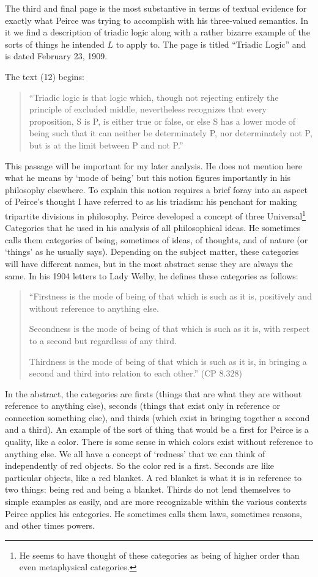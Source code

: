The third and final page is the most substantive in terms of textual evidence for exactly what Peirce was trying to accomplish with his three-valued semantics. In it we find a description of triadic logic along with a rather bizarre example of the sorts of things he intended $L$ to apply to. The page is titled ``Triadic Logic'' and is dated February 23, 1909. 

The text (12) begins: \begin{quotation}\noindent``Triadic logic is that logic which, though not rejecting entirely the principle of excluded middle, nevertheless recognizes that every proposition, S is P, is either true or false, or else S has a lower mode of being such that it can neither be determinately P, nor determinately not P, but is at the limit between P and not P.''\end{quotation} This passage will be important for my later analysis. He does not mention here what he means by `mode of being' but this notion figures importantly in his philosophy elsewhere. To explain this notion requires a brief foray into an aspect of Peirce's thought I have referred to as his triadism: his penchant for making tripartite divisions in philosophy.  Peirce developed a concept of three Universal\footnote{He seems to have thought of these categories as being of higher order than even metaphysical categories.} Categories that he used in his analysis of all philosophical ideas. He sometimes calls them categories of being, sometimes of ideas, of thoughts, and of nature (or `things' as he usually says). Depending on the subject matter, these categories will have different names, but in the most abstract sense they are always the same. In his 1904 letters to Lady Welby, he defines these categories as follows:
\begin{quotation}
\noindent``Firstness is the mode of being of that which is such as it is, positively and without reference to anything else.

Secondness is the mode of being of that which is such as it is, with respect to a second but regardless of any third.

Thirdness is the mode of being of that which is such as it is, in bringing a second and third into relation to each other.'' (CP 8.328)
\end{quotation}
 In the abstract, the categories are firsts (things that are what they are without reference to anything else), seconds (things that exist only in reference or connection something else), and thirds (which exist in bringing together a second and a third). An example of the sort of thing that would be a first for Peirce is a quality, like a color. There is some sense in which colors exist without reference to anything else. We all have a concept of `redness' that we can think of independently of red objects. So the color red is a first. Seconds are like particular objects, like a red blanket. A red blanket is what it is in reference to two things: being red and being a blanket. Thirds do not lend themselves to simple examples as easily, and are more recognizable within the various contexts Peirce applies his categories. He sometimes calls them laws, sometimes reasons, and other times powers.

